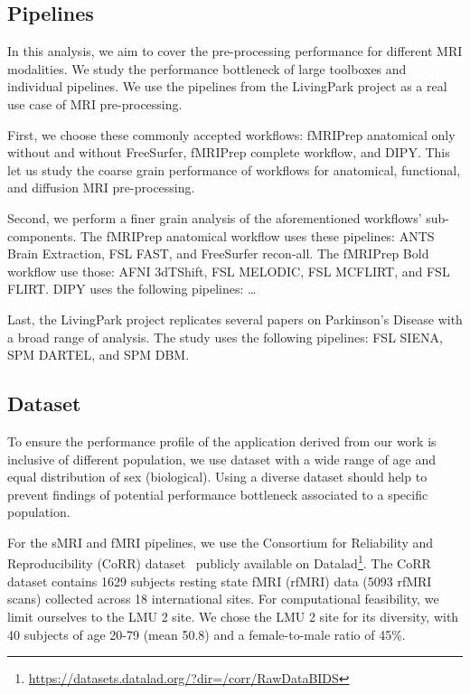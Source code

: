 \documentclass[conference]{IEEEtran}
\begin{document}
\subsection{Pipelines}
In this analysis, we aim to cover the pre-processing performance for different MRI modalities. We study the performance bottleneck of large toolboxes and individual pipelines. We use the pipelines from the LivingPark project as a real use case of MRI pre-processing.

First, we choose these commonly accepted workflows: fMRIPrep anatomical only without and without FreeSurfer, fMRIPrep complete workflow, and DIPY. This let us study the coarse grain performance of workflows for anatomical, functional, and diffusion MRI pre-processing. 

Second, we perform a finer grain analysis of the aforementioned workflows' sub-components. The fMRIPrep anatomical workflow uses these pipelines: ANTS Brain Extraction, FSL FAST, and FreeSurfer recon-all. The fMRIPrep Bold workflow use those: AFNI 3dTShift, FSL MELODIC, FSL MCFLIRT, and FSL FLIRT. DIPY uses the following pipelines: \dots

Last, the LivingPark project replicates several papers on Parkinson's Disease with a broad range of analysis. The study uses the following pipelines: FSL SIENA, SPM DARTEL, and SPM DBM.

\subsection{Dataset}
To ensure the performance profile of the application derived from our work is inclusive of different population, we use dataset with a wide range of age and equal distribution of sex (biological). Using a diverse dataset should help to prevent findings of potential performance bottleneck associated to a specific population.

For the sMRI and fMRI pipelines, we use the Consortium for Reliability and Reproducibility (CoRR) dataset~\cite{Zuo2014-xa} publicly available on Datalad\footnote{\href{https://datasets.datalad.org/?dir=/corr/RawDataBIDS}{https://datasets.datalad.org/?dir=/corr/RawDataBIDS}}. The CoRR dataset contains 1629 subjects resting state fMRI (rfMRI) data (5093 rfMRI scans) collected across 18 international sites. For computational feasibility, we limit ourselves to the LMU 2 site. We chose the LMU 2 site for its diversity, with 40 subjects of age 20-79 (mean 50.8) and a female-to-male ratio of 45\%.
\end{document}
